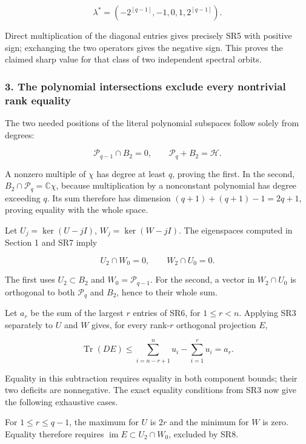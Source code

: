 \[
\lambda^*=(-2^{[q-1]},-1,0,1,2^{[q-1]}).
\tag{SR6}
\]

Direct multiplication of the diagonal entries gives precisely SR5 with positive sign; exchanging the two operators gives the negative sign. This proves the claimed sharp value for that class of two independent spectral orbits.

\subsubsection{3. The polynomial intersections exclude every nontrivial rank equality}\label{endpoint-four_window_sharpness_review--the-polynomial-intersections-exclude-every-nontrivial-rank-equality}

The two needed positions of the literal polynomial subspaces follow solely from degrees:

\[
\mathcal P_{q-1}\cap B_2=0,\qquad
\mathcal P_q+B_2=\mathcal H.
\tag{SR7}
\]

A nonzero multiple of \(\chi\) has degree at least \(q\), proving the first. In the second, \(B_2\cap\mathcal P_q=\mathbb C\chi\), because multiplication by a nonconstant polynomial has degree exceeding \(q\). Its sum therefore has dimension \((q+1)+(q+1)-1=2q+1\), proving equality with the whole space.

Let \(U_j=\ker(U-jI)\), \(W_j=\ker(W-jI)\). The eigenspaces computed in Section 1 and SR7 imply

\[
U_2\cap W_0=0,\qquad W_2\cap U_0=0.
\tag{SR8}
\]

The first uses \(U_2\subset B_2\) and \(W_0=\mathcal P_{q-1}\). For the second, a vector in \(W_2\cap U_0\) is orthogonal to both \(\mathcal P_q\) and \(B_2\), hence to their whole sum.

Let \(a_r\) be the sum of the largest \(r\) entries of SR6, for \(1\le r<n\). Applying SR3 separately to \(U\) and \(W\) gives, for every rank-\(r\) orthogonal projection \(E\),

\[
\operatorname{Tr}(DE)\le
\sum_{i=n-r+1}^{n}u_i-\sum_{i=1}^{r}u_i=a_r.
\tag{SR9}
\]

Equality in this subtraction requires equality in both component bounds; their two deficits are nonnegative. The exact equality conditions from SR3 now give the following exhaustive cases.

For \(1\le r\le q-1\), the maximum for \(U\) is \(2r\) and the minimum for \(W\) is zero. Equality therefore requires \(\operatorname{im}E\subset U_2\cap W_0\), excluded by SR8.

